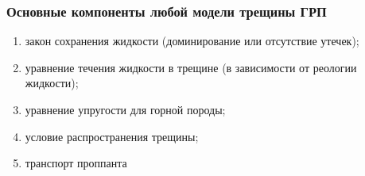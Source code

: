 \documentclass{beamer}
\begin{document}
\begin{frame}
\frametitle{Основные компоненты любой модели трещины ГРП}

\begin{enumerate}[1)]
	\item закон сохранения жидкости (доминирование или отсутствие утечек);
	\item уравнение течения жидкости в трещине (в зависимости от реологии жидкости);
	\item уравнение упругости для горной породы;
	\item условие распространения трещины;
	\item транспорт проппанта
\end{enumerate}

\end{frame}
\end{document}
